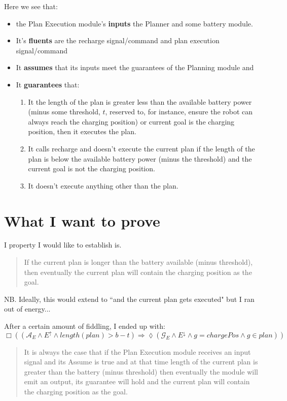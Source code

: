 \documentclass{blue-book}
\let\sometime=\lozenge
\let\always=\Box
\begin{document}
 Here we see that:
 \begin{itemize}
\item the Plan Execution module's {\bf inputs} the Planner and some battery module.
\item It's {\bf fluents} are the recharge signal/command and plan execution signal/command
\item It {\bf assumes} that its inputs meet the guarantees of the Planning module and
\item It {\bf guarantees} that:
 \begin{enumerate}
 \item It the length of the plan is greater less than the available battery power (minus some threshold, $t$, reserved to, for instance, ensure the robot can always reach the charging position) or current goal is the charging position, then it executes the plan.
  \item It calls recharge and doesn't execute the current plan if the length of the plan is below the available battery power (minus the threshold) and the current goal is not the charging position.
 \item It doesn't execute anything other than the plan.
\end{enumerate}
 \end{itemize}
 
 \section{What I want to prove}
 
 I property I would like to establish is.
 
 \begin{quote}
 If the current plan is longer than the battery available (minus threshold), then eventually the current plan will contain the charging position as the goal.
 \end{quote}
 NB.  Ideally, this would extend to ``and the current plan gets executed" but I ran out of energy...
 
 After a certain amount of fiddling, I ended up with:
 \begin{equation}
 \always ((\mathcal{A}_E \land E^{\uparrow} \land length(plan) > b - t ) \Rightarrow \sometime (\mathcal{G}_E \land E^{\downarrow} \land g = chargePos \land  g \in plan))
 \end{equation}
\begin{quote}
It is always the case that if the Plan Execution module receives an input signal and its Assume is true and at that time length of the current plan is greater than the battery (minus threshold) then eventually the module will emit an output, its guarantee will hold and the current plan will contain the charging position as the goal.
\end{quote}
\end{document}
